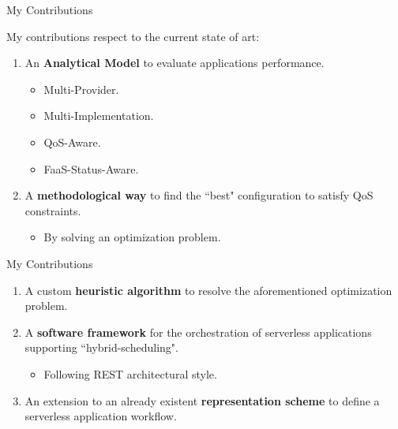 \documentclass[13.5pt]{beamer}
\newcommand{\B}[1]{\textcolor{TorVergataColor}{\textbf{#1}}}
\begin{document}
\begin{frame}{My Contributions}
	
	My contributions respect to the current state of art:
	\vspace{\baselineskip}
	\begin{enumerate}
	
		\item An \B{Analytical Model} to evaluate applications performance.
		\begin{itemize}
			\item Multi-Provider.
			\item Multi-Implementation.
			\item QoS-Aware.
			\item FaaS-Status-Aware.
		\end{itemize}
		\vspace{\baselineskip} 
		\item A \B{methodological way} to find the ``best" configuration to satisfy QoS constraints.
		\begin{itemize}
			\item By solving an optimization problem.
		\end{itemize}
		\vspace{\baselineskip} 
		
	\end{enumerate}
	
\end{frame} 


\begin{frame}{My Contributions}
	
	\vspace{\baselineskip}
	\begin{enumerate}
		\justifying
		\setcounter{enumi}{2}
		\item A custom \B{heuristic algorithm} to resolve the aforementioned optimization problem.
		\vspace{\baselineskip} 
		\item A \B{software framework} for the orchestration of serverless applications supporting ``hybrid-scheduling".
		\begin{itemize}
			\item Following REST architectural style.
		\end{itemize}
		\vspace{\baselineskip} 
		\item An extension to an already existent \B{representation scheme} to define a serverless application workflow.
		\vspace{\baselineskip} 
		
		
	\end{enumerate}
	
\end{frame} 
\end{document}
